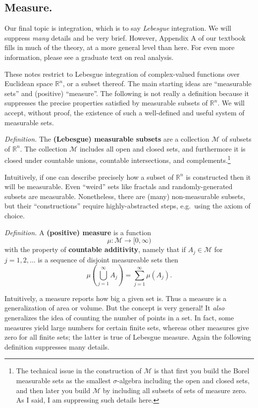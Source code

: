 \documentclass[12pt]{article}
\newcommand{\cM}{\mathcal{M}}
\newcommand{\RR}{\mathbb{R}}
\newcommand{\sect}[1]{\subsection*{#1.}}
\newcommand{\defin}{\emph{Definition.}\,\,}
\begin{document}
\sect{Measure}

Our final topic is integration, which is to say \emph{Lebesgue} integration.  We will suppress \emph{many} details and be very brief.  However, Appendix A of our textbook fills in much of the theory, at a more general level than here.  For even more information, please see a graduate text on real analysis.

These notes restrict to Lebesgue integration of complex-valued functions over Euclidean space $\RR^n$, or a subset thereof.  The main starting ideas are ``measurable sets'' and (positive) ``measure''.  The following is not really a definition because it suppresses the precise properties satisfied by measurable subsets of $\RR^n$.  We will accept, without proof, the existence of such a well-defined and useful system of measurable sets.

\defin The \textbf{(Lebesgue) measurable subsets} are a collection $\cM$ of subsets of $\RR^n$.  The collection $\cM$ includes all open and closed sets, and furthermore it is closed under countable unions, countable intersections, and complements.\footnote{The technical issue in the construction of $\cM$ is that first you build the Borel measurable sets as the smallest $\sigma$-algebra including the open and closed sets, and then later you build $\cM$ by including all subsets of sets of measure zero.  As I said, I am suppressing such details here.}

Intuitively, if one can describe precisely how a subset of $\RR^n$ is constructed then it will be measurable.  Even ``weird'' sets like fractals and randomly-generated subsets are measurable.  Nonetheless, there are (many) non-measurable subsets, but their ``constructions'' require highly-abstracted steps, e.g.~using the axiom of choice.

\defin A \textbf{(positive) measure} is a function
	$$\mu : \cM \to [0,\infty)$$
with the property of \textbf{countable additivity}, namely that if $A_j \in \cM$ for $j=1,2,\dots$ is a sequence of disjoint measureable sets then
	$$\mu\left(\bigcup_{j=1}^\infty A_j\right) = \sum_{j=1}^\infty \mu(A_j).$$

Intuitively, a measure reports how big a given set is.  Thus a measure is a generalization of area or volume.  But the concept is very general!  It \emph{also} generalizes the idea of counting the number of points in a set.  In fact, some measures yield large numbers for certain finite sets, whereas other measures give zero for all finite sets; the latter is true of Lebesgue measure.  Again the following definition suppresses many details.
\end{document}
